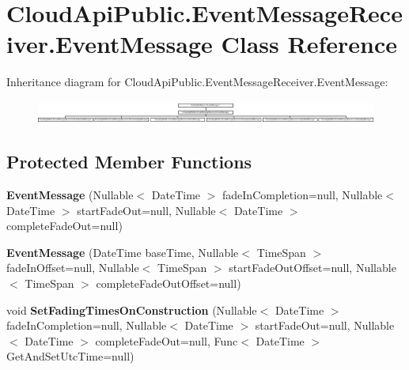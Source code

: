 \hypertarget{class_cloud_api_public_1_1_event_message_receiver_1_1_event_message}{\section{Cloud\-Api\-Public.\-Event\-Message\-Receiver.\-Event\-Message Class Reference}
\label{class_cloud_api_public_1_1_event_message_receiver_1_1_event_message}
}
Inheritance diagram for Cloud\-Api\-Public.\-Event\-Message\-Receiver.\-Event\-Message\-:\begin{figure}[H]
\begin{center}
\leavevmode
\includegraphics[height=0.750670cm]{class_cloud_api_public_1_1_event_message_receiver_1_1_event_message}
\end{center}
\end{figure}
\subsection*{Protected Member Functions}
\begin{DoxyCompactItemize}
\item 
\hypertarget{class_cloud_api_public_1_1_event_message_receiver_1_1_event_message_a469f23b2ec000e5f2dc61f9c7d230df4}{{\bfseries Event\-Message} (Nullable$<$ Date\-Time $>$ fade\-In\-Completion=null, Nullable$<$ Date\-Time $>$ start\-Fade\-Out=null, Nullable$<$ Date\-Time $>$ complete\-Fade\-Out=null)}\label{class_cloud_api_public_1_1_event_message_receiver_1_1_event_message_a469f23b2ec000e5f2dc61f9c7d230df4}

\item 
\hypertarget{class_cloud_api_public_1_1_event_message_receiver_1_1_event_message_ae60772cdfe067cec0e9079be66353bf2}{{\bfseries Event\-Message} (Date\-Time base\-Time, Nullable$<$ Time\-Span $>$ fade\-In\-Offset=null, Nullable$<$ Time\-Span $>$ start\-Fade\-Out\-Offset=null, Nullable$<$ Time\-Span $>$ complete\-Fade\-Out\-Offset=null)}\label{class_cloud_api_public_1_1_event_message_receiver_1_1_event_message_ae60772cdfe067cec0e9079be66353bf2}

\item 
\hypertarget{class_cloud_api_public_1_1_event_message_receiver_1_1_event_message_a9a4125f4fe9d8eaa533937762cffa040}{void {\bfseries Set\-Fading\-Times\-On\-Construction} (Nullable$<$ Date\-Time $>$ fade\-In\-Completion=null, Nullable$<$ Date\-Time $>$ start\-Fade\-Out=null, Nullable$<$ Date\-Time $>$ complete\-Fade\-Out=null, Func$<$ Date\-Time $>$ Get\-And\-Set\-Utc\-Time=null)}\label{class_cloud_api_public_1_1_event_message_receiver_1_1_event_message_a9a4125f4fe9d8eaa533937762cffa040}

\end{DoxyCompactItemize}
